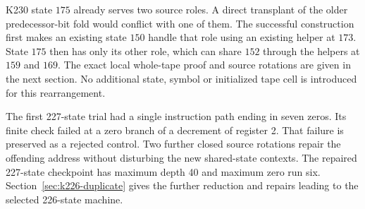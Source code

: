 K230 state $175$ already serves two source roles. A direct transplant of
the older predecessor-bit fold would conflict with one of them. The
successful construction first makes an existing state $150$ handle that
role using an existing helper at $173$. State $175$ then has only its
other role, which can share $152$ through the helpers at $159$ and $169$.
The exact local whole-tape proof and source rotations are given in the
next section. No additional state, symbol or initialized tape cell is
introduced for this rearrangement.

The first 227-state trial had a single instruction path ending in seven
zeros. Its finite check failed at a zero branch of a decrement of register
2. That failure is preserved as a rejected control. Two further closed
source rotations repair the offending address without disturbing the
new shared-state contexts. The repaired 227-state checkpoint has maximum depth 40 and
maximum zero run six. Section~\ref{sec:k226-duplicate} gives the further
reduction and repairs leading to the selected 226-state machine.
